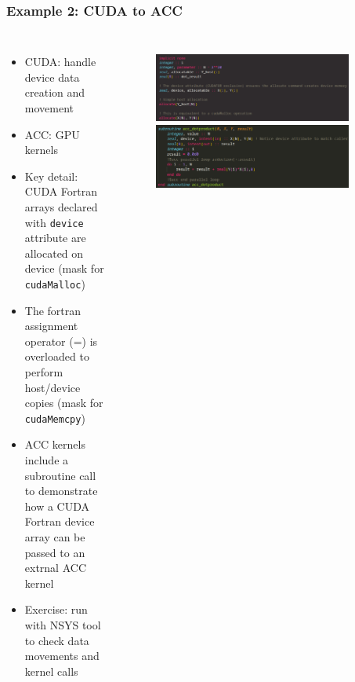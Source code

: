 \begin{frame}
	\frametitle{Example 2: CUDA to ACC}
	\begin{columns}
		\begin{itemize}
			\item CUDA: handle device data creation and movement
			\item ACC: GPU kernels
			\item Key detail: CUDA Fortran arrays declared with \texttt{device} attribute are allocated on device (mask for \texttt{cudaMalloc})
			\item The fortran assignment operator (=) is overloaded to perform host/device copies (mask for \texttt{cudaMemcpy})
			\item ACC kernels include a subroutine call to demonstrate how a CUDA Fortran device array can be passed to an extrnal ACC kernel
			\item Exercise: run with NSYS tool to check data movements and kernel calls
		\end{itemize}
		\begin{figure}
			\centering
			\includegraphics[width=0.9\textwidth]{images/cuda2acc_data.png}
			\includegraphics[width=0.9\textwidth]{images/cuda2acc_routine.png}
		\end{figure}
	\end{columns}
\end{frame}
